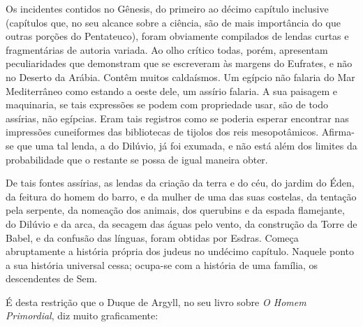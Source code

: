 \documentclass[11pt,a5paper,twoside,openany]{book}
\begin{document}
Os incidentes contidos no Gênesis, do primeiro ao décimo capítulo inclusive (capítulos que, no seu alcance sobre a ciência, são de mais importância do que outras porções do Pentateuco), foram obviamente compilados de lendas curtas e fragmentárias de autoria variada. Ao olho crítico todas, porém, apresentam peculiaridades que demonstram que se escreveram às margens do Eufrates, e não no Deserto da Arábia. Contêm muitos caldaísmos. Um egípcio não falaria do Mar Mediterrâneo como estando a oeste dele, um assírio falaria. A sua paisagem e maquinaria, se tais expressões se podem com propriedade usar, são de todo assírias, não egípcias. Eram tais registros como se poderia esperar encontrar nas impressões cuneiformes das bibliotecas de tijolos dos reis mesopotâmicos. Afirma-se que uma tal lenda, a do Dilúvio, já foi exumada, e não está além dos limites da probabilidade que o restante se possa de igual maneira obter.

De tais fontes assírias, as lendas da criação da terra e do céu, do jardim do Éden, da feitura do homem do barro, e da mulher de uma das suas costelas, da tentação pela serpente, da nomeação dos animais, dos querubins e da espada flamejante, do Dilúvio e da arca, da secagem das águas pelo vento, da construção da Torre de Babel, e da confusão das línguas, foram obtidas por Esdras. Começa abruptamente a história própria dos judeus no undécimo capítulo. Naquele ponto a sua história universal cessa; ocupa-se com a história de uma família, os descendentes de Sem.

É desta restrição que o Duque de Argyll, no seu livro sobre \textit{O Homem Primordial}, diz muito graficamente:
\end{document}

